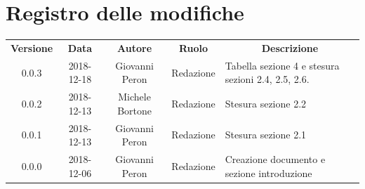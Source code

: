 \documentclass[11pt,a4paper]{article}
\begin{document}
	

	\tableofcontents
	\newpage
	\section*{\centering Registro delle modifiche}
	\begin{tabularx}{\textwidth}{ c | c | c | c | X }
		\rowcolor{LightBlue}
		\color{white}\bfseries Versione & \color{white}\bfseries Data & \color{white}\bfseries Autore & \color{white}\bfseries Ruolo & \multicolumn{1}{c}{\color{white}\bfseries Descrizione}\\[0.25cm]
		0.0.3 & 2018-12-18 & Giovanni Peron & Redazione & Tabella sezione 4 e stesura sezioni 2.4, 2.5, 2.6.\\
		0.0.2 & 2018-12-13 & Michele Bortone & Redazione & Stesura sezione 2.2 \\
		0.0.1 & 2018-12-13 & Giovanni Peron & Redazione & Stesura sezione 2.1 \\
		0.0.0 & 2018-12-06 & Giovanni Peron & Redazione & Creazione documento e
sezione introduzione \\


	\end{tabularx}
	\newpage
		
	\newpage
	
	\newpage
	
	\newpage
	\newpage
		
\end{document}
